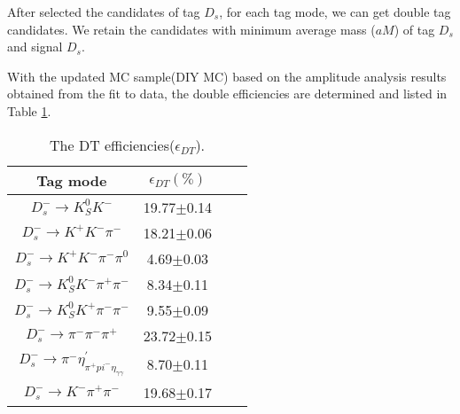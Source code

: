 After selected the candidates of tag $D_{s}$, for each tag mode, we can get double tag candidates. 
We retain the candidates with minimum average mass ($aM$) of tag $D_{s}$ and signal $D_{s}$.


With the updated MC sample(DIY MC) based on the amplitude analysis results obtained from the fit to data, the double efficiencies are determined and listed in Table \ref{DT-eff}.

    \begin{table}[htbp]
        \caption{ The DT efficiencies($\epsilon_{DT}$).}
        \label{DT-eff}
        \begin{center}
            \begin{tabular}{cccc}
                \toprule\toprule
                Tag mode   & $\epsilon_{DT}(\%)$\\
                \hline
                $D_{s}^{-} \rightarrow K_{S}^{0}K^{-}$                                                   & 19.77$\pm$0.14\\
                $D_{s}^{-} \rightarrow K^{+}K^{-}\pi^{-}$                                                & 18.21$\pm$0.06\\
                $D_{s}^{-} \rightarrow K^{+}K^{-}\pi^{-}\pi^{0}$                                         &  4.69$\pm$0.03\\
                $D_{s}^{-} \rightarrow K_{S}^{0}K^{-}\pi^{+}\pi^{-}$                                     &  8.34$\pm$0.11\\
                $D_{s}^{-} \rightarrow K_{S}^{0}K^{+}\pi^{-}\pi^{-}$                                     &  9.55$\pm$0.09\\
                $D_{s}^{-} \rightarrow \pi^{-}\pi^{-}\pi^{+}$                                            & 23.72$\pm$0.15\\
                $D_{s}^{-} \rightarrow \pi^{-}\eta_{\pi^{+}pi^{-}\eta_{\gamma\gamma}}^{'}$               &  8.70$\pm$0.11\\
                $D_{s}^{-} \rightarrow K^{-}\pi^{+}\pi^{-}$                                              & 19.68$\pm$0.17\\
                \bottomrule\bottomrule
            \end{tabular}
        \end{center}
    \end{table}

